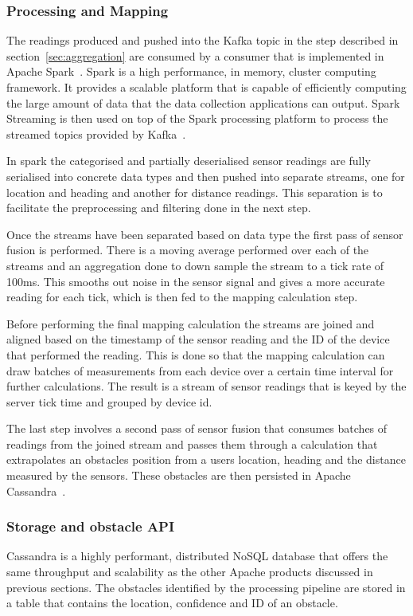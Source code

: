 \documentclass[prodmode,acmtosem]{acmsmall} %
\begin{document}
\subsubsection{Processing and Mapping}
The readings produced and pushed into the Kafka topic in the step described in section~\ref{sec:aggregation} are consumed by a consumer that is implemented in Apache Spark~\cite{ApacheSpark}. Spark is a high performance, in memory, cluster computing framework. It provides a scalable platform that is capable of efficiently computing the large amount of data that the data collection applications can output. Spark Streaming is then used on top of the Spark processing platform to process the streamed topics provided by Kafka~\cite{ApacheSparkStreaming}.

In spark the categorised and partially deserialised sensor readings are fully serialised into concrete data types and then pushed into separate streams, one for location and heading and another for distance readings. This separation is to facilitate the preprocessing and filtering done in the next step. 

Once the streams have been separated based on data type the first pass of sensor fusion is performed. There is a moving average performed over each of the streams and an aggregation done to down sample the stream to a tick rate of 100ms. This smooths out noise in the sensor signal and gives a more accurate reading for each tick, which is then fed to the mapping calculation step.

Before performing the final mapping calculation the streams are joined and aligned based on the timestamp of the sensor reading and the ID of the device that performed the reading. This is done so that the mapping calculation can draw batches of measurements from each device over a certain time interval for further calculations. The result is a stream of sensor readings that is keyed by the server tick time and grouped by device id.

The last step involves a second pass of sensor fusion that consumes batches of readings from the joined stream and passes them through a calculation that extrapolates an obstacles position from a users location, heading and the distance measured by the sensors. These obstacles are then persisted in Apache Cassandra~\cite{ApacheCassandra}.

\subsubsection{Storage and obstacle API}
Cassandra is a highly performant, distributed NoSQL database that offers the same throughput and scalability as the other Apache products discussed in previous sections. The obstacles identified by the processing pipeline are stored in a table that contains the location, confidence and ID of an obstacle.
\end{document}
